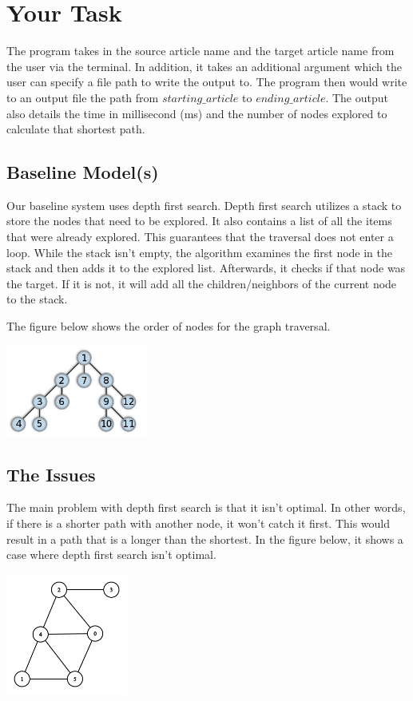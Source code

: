 \documentclass[letterpaper]{article} %
\begin{document}
\section{Your Task}

The program takes in the source article name and the target article name from the user via the terminal. In addition, it takes an additional argument which the user can specify a file path to write the output to. The program then would write to an output file the path from $starting\_article$ to $ending\_article$. The output also details the time in millisecond (ms) and the number of nodes explored to calculate that shortest path.


\subsection{Baseline Model(s)}

Our baseline system uses depth first search. Depth first search utilizes a stack to store the nodes that need to be explored. It also contains a list of all the items that were already explored. This guarantees that the traversal does not enter a loop. While the stack isn't empty, the algorithm examines the first node in the stack and then adds it to the explored list. Afterwards, it checks if that node was the target. If it is not, it will add all the children/neighbors of the current node to the stack.

The figure below shows the order of nodes for the graph traversal.

\includegraphics[width=0.35\textwidth]{Images/BFS_tree.png}

\subsection{The Issues}

The main problem with depth first search is that it isn't optimal. In other words, if there is a shorter path with another node, it won't catch it first. This would result in a path that is a longer than the shortest. In the figure below, it shows a case where depth first search isn't optimal. 

\includegraphics[width=0.30\textwidth]{Images/graph.png}
\end{document}
